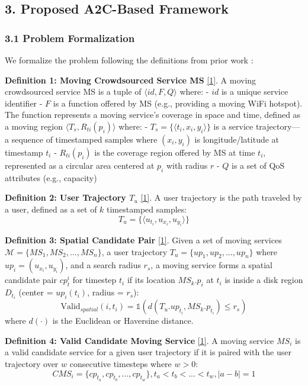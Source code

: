 \subsection{3. Proposed A2C-Based
	Framework}\label{proposed-a2c-based-framework}

\hypertarget{problem-formalization}{%
	\subsubsection{3.1 Problem Formalization}\label{problem-formalization}}

We formalize the problem following the definitions from prior work
:

\textbf{Definition 1: Moving Crowdsourced Service MS} \hyperlink{cite.neiat2021}{\hyperlink{cite.neiat2021}{[1]}}. A moving
crowdsourced service MS is a tuple of \(\langle id, F, Q \rangle\)
where: - \(id\) is a unique service identifier - \(F\) is a function
offered by MS (e.g., providing a moving WiFi hotspot). The function
represents a moving service's coverage in space and time, defined as a
moving region \(\langle T_s, R_{ti}(p_i) \rangle\) where: -
\(T_s = \{\langle t_i, x_i, y_i \rangle\}\) is a service trajectory---a
sequence of timestamped samples where \((x_i, y_i)\) is
longitude/latitude at timestamp \(t_i\) - \(R_{ti}(p_i)\) is the
coverage region offered by MS at time \(t_i\), represented as a circular
area centered at \(p_i\) with radius \(r\) - \(Q\) is a set of QoS
attributes (e.g., capacity)

\textbf{Definition 2: User Trajectory \(T_u\)} \hyperlink{cite.neiat2021}{\hyperlink{cite.neiat2021}{[1]}}. A user trajectory is the
path traveled by a user, defined as a set of \(k\) timestamped samples:
\[T_u = \{\langle u_{t_i}, u_{x_i}, u_{y_i} \rangle\}\]

\textbf{Definition 3: Spatial Candidate Pair} \hyperlink{cite.neiat2021}{\hyperlink{cite.neiat2021}{[1]}}. Given a set of moving
services \(\mathcal{M} = \{MS_1, MS_2, ..., MS_n\}\), a user trajectory
\(T_u = \{up_1, up_2, ..., up_n\}\) where \(up_i = (u_{x_i}, u_{y_i})\),
and a search radius \(r_s\), a moving service forms a spatial candidate
pair \(cp_t^i\) for timestep \(t_i\) if its location \(MS_k.p_i\) at
\(t_i\) is inside a disk region \(D_{t_i}\) (center = \(up_i(t_i)\),
radius = \(r_s\)):
\[\text{Valid}_{spatial}(i, t_i) = \mathbb{1}(d(T_u.up_{t_i}, MS_k.p_{t_i}) \leq r_s)\]
where \(d(\cdot)\) is the Euclidean or Haversine distance.

\textbf{Definition 4: Valid Candidate Moving Service} \hyperlink{cite.neiat2021}{\hyperlink{cite.neiat2021}{[1]}}. A moving service
\(MS_i\) is a valid candidate service for a given user trajectory if it
is paired with the user trajectory over \(w\) consecutive timesteps
where \(w > 0\):
\[CMS_i = \{cp_{t_a}, cp_{t_b}, ..., cp_{t_w}\}, t_a < t_b < ... < t_w, |a - b| = 1\]

